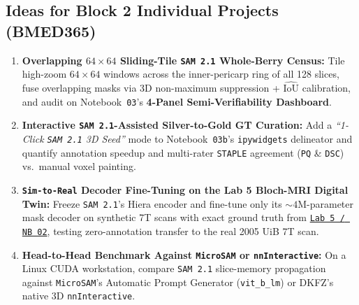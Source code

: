 \documentclass[10.5pt,a4paper]{article}
\begin{document}
\subsection{Ideas for Block 2 Individual Projects (BMED365)}
\begin{enumerate}
    \item \textbf{Overlapping $64 \times 64$ Sliding-Tile \texttt{SAM 2.1} Whole-Berry Census:} Tile high-zoom $64 \times 64$ windows across the inner-pericarp ring of all 128 slices, fuse overlapping masks via 3D non-maximum suppression + $\widehat{\text{IoU}}$ calibration, and audit on Notebook~\texttt{03}'s \textbf{4-Panel Semi-Verifiability Dashboard}.
    \item \textbf{Interactive \texttt{SAM 2.1}-Assisted Silver-to-Gold GT Curation:} Add a \emph{``1-Click \texttt{SAM 2.1} 3D Seed''} mode to Notebook~\texttt{03b}'s \texttt{ipywidgets} delineator and quantify annotation speedup and multi-rater \texttt{STAPLE} agreement (\texttt{PQ} \& \texttt{DSC}) vs.\ manual voxel painting.
    \item \textbf{\texttt{Sim-to-Real} Decoder Fine-Tuning on the Lab 5 Bloch-MRI Digital Twin:} Freeze \texttt{SAM 2.1}'s Hiera encoder and fine-tune only its $\sim 4\text{M}$-parameter mask decoder on synthetic 7T scans with exact ground truth from \href{https://github.com/arvidl/BMED365-2027/blob/main/Lab5-Comp-Mod/Kiwi-challenge/notebooks/02-kiwi-digital-twin-and-inverse-problems.ipynb}{\texttt{Lab 5 / NB 02}}, testing zero-annotation transfer to the real 2005 UiB 7T scan.
    \item \textbf{Head-to-Head Benchmark Against \texttt{MicroSAM} or \texttt{nnInteractive}:} On a Linux CUDA workstation, compare \texttt{SAM 2.1} slice-memory propagation against \texttt{MicroSAM}'s Automatic Prompt Generator (\texttt{vit\_b\_lm}) or DKFZ's native 3D \texttt{nnInteractive}.
\end{enumerate}
\end{document}

